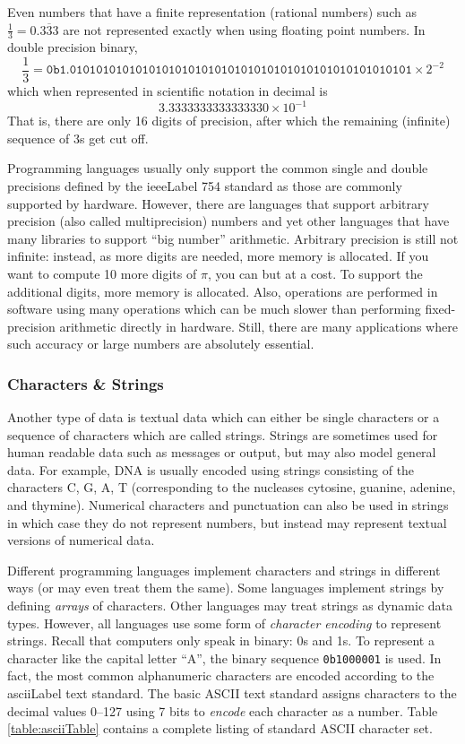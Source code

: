Even numbers that have a finite representation (rational numbers) such as 
$\frac{1}{3} = 0.\overline{333}$ are not represented exactly when using floating point numbers.
In double precision binary, 
  $$\frac{1}{3} = \texttt{0b1.0101010101010101010101010101010101010101010101010101} \times 2^{-2}$$
which when represented in scientific notation in decimal is
  $$3.3333333333333330 \times 10^{-1}$$
That is, there are only 16 digits of precision, after which the remaining (infinite) sequence of $3$s 
get cut off.

Programming languages usually only support the common single and double precisions
defined by the \gls{ieeeLabel} 754 standard as those are commonly supported by hardware.
However, there are languages that support arbitrary precision (also called multiprecision) 
numbers and yet other languages that have many libraries to support ``big number'' arithmetic.
Arbitrary precision is still not infinite: instead, as more digits are needed, more memory is
allocated.  If you want to compute 10 more digits of $\pi$, you can but at a cost.  To support
the additional digits, more memory is allocated.  Also, operations are performed in software
using many operations which can be much slower than performing fixed-precision arithmetic
directly in hardware.  Still, there are many applications where such accuracy or large numbers
are absolutely essential.  

\subsubsection{Characters \& Strings}

Another type of data is textual data which can either be single characters or a sequence of
characters which are called \glspl{string}.  Strings are sometimes used for human readable
data such as messages or output, but may also model general data.  For example, DNA is
usually encoded using strings consisting of the characters C, G, A, T (corresponding to the nucleases
cytosine, guanine, adenine, and thymine).  Numerical characters and punctuation can
also be used in strings in which case they do not represent numbers, but instead may
represent textual versions of numerical data.  

Different programming languages implement characters and strings in different ways 
(or may even treat them the same).  Some languages implement strings by defining
\emph{arrays} of characters.  Other languages may treat strings as dynamic data types.
However, all languages use some form of \emph{character encoding} to represent
strings.  Recall that computers only speak in binary: 0s and 1s.  To represent a character
like the capital letter ``A'', the binary sequence \texttt{0b1000001} is used.  In fact, the
most common alphanumeric characters are encoded according to the \gls{asciiLabel}
text standard.  The basic ASCII text standard assigns characters to the decimal values
0--127 using 7 bits to \emph{encode} each character as a number.  Table \ref{table:asciiTable}
contains a complete listing of standard ASCII character set.  

